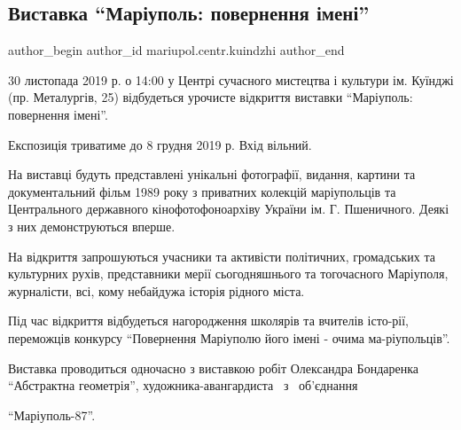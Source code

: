  
 
 
 
 

\subsection{Виставка \enquote{Маріуполь: повернення імені}}
\label{sec:28_11_2019.fb.mariupol.centr.kuindzhi.1.vidkryttja_vystavky_mariupol_povernennja_imeni}

\ifcmt
 author_begin
   author_id mariupol.centr.kuindzhi
 author_end
\fi

	
30 листопада 2019 р. о 14:00 у Центрі сучасного мистецтва і культури ім. Куїнджі
(пр. Металургів, 25) відбудеться урочисте відкриття виставки \enquote{Маріуполь:
повернення імені}.

Експозиція триватиме до 8 грудня 2019 р. Вхід вільний. 

На виставці будуть представлені унікальні фотографії, видання, картини та
документальний фільм 1989 року з приватних колекцій маріупольців та
Центрального державного кінофотофоноархіву України ім. Г. Пшеничного. Деякі з
них демонструються вперше. 

На відкриття запрошуються учасники та активісти політичних, громадських та
культурних рухів, представники мерії сьогодняшнього та тогочасного Маріуполя,
журналісти, всі, кому небайдужа історія рідного міста. 

Під час відкриття відбудеться нагородження школярів та вчителів істо\hyp{}рії,
переможців конкурсу \enquote{Повернення Маріуполю його імені - очима
ма\hyp{}ріупольців}. 

Виставка проводиться одночасно з виставкою робіт Олександра Бондаренка~~
\enquote{Абстрактна геометрія}, художника-авангардиста ~з~ об'єднання\par\noindent
\enquote{Маріуполь-87}.


